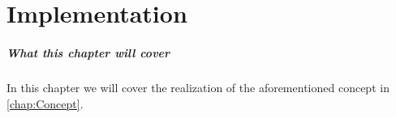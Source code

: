 \documentclass[main.tex]{subfiles}
\begin{document}
\chapter{Implementation}
\paragraph*{What this chapter will cover}
In this chapter we will cover the realization of the aforementioned concept in \autoref{chap:Concept}.




\end{document}
